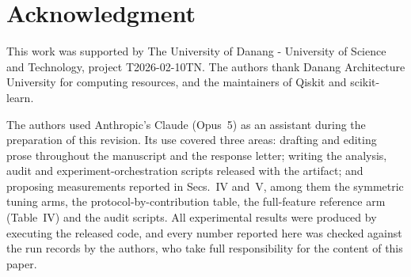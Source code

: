 \section*{Acknowledgment}
This work was supported by The University of Danang - University of Science
and Technology, project T2026-02-10TN. The authors thank Danang Architecture
University for computing resources, and the maintainers of Qiskit and
scikit-learn.
\begin{revbody}
The authors used Anthropic's Claude (Opus~5) as an assistant during the
preparation of this revision. Its use covered three areas: drafting and editing
prose throughout the manuscript and the response letter; writing the analysis,
audit and experiment-orchestration scripts released with the artifact; and
proposing measurements reported in Secs.~IV and~V, among them the symmetric
tuning arms, the protocol-by-contribution table, the full-feature reference arm
(Table~IV) and the audit scripts. All experimental results were produced by
executing the released code, and every number reported here was checked
against the run records by the authors, who take full responsibility for the
content of this paper.
\end{revbody}



